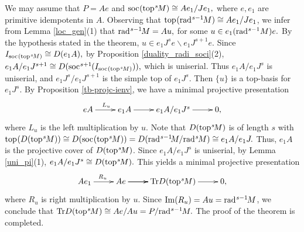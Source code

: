 \documentclass[10pt]{amsart}
\theoremstyle{definition}
\newcommand{\rad}{{\rm rad}\hspace{.5pt}}
\newcommand{\soc}{{\rm soc}\hspace{.5pt}}
\newcommand{\ntop}{{\rm top}\hspace{.5pt}}
\newcommand{\vp}{\vspace{.5pt}}
\begin{document}
We may assume that $P=Ae$ and $\soc(\ntop^s\hspace{-1pt}M)\cong Ae_1/Je_1,$ where $e, e_1$ are primitive idempotents in $A$. Observing that $\ntop(\rad^{s-1}\hspace{-1pt}M)\cong Ae_1/Je_1$, we infer from Lemma \ref{loc_gen}(1) that $\rad^{s-1}\hspace{-1pt}M=Au,$ for some $u\in e_1 (\rad^{s-1}M)e.$ By the hypothesis stated in the theorem, $u \in e_1J^se \backslash e_1J^{s+1} e$. Since $I_{\soc(\ntop^s\hspace{-1pt}M)}\cong D(e_1A),$ by Proposition \ref{duality_radi_soci}(2), $e_1A/e_1J^{s+1}\cong D(\soc^{s+1}\hspace{-.5pt}(I_{\soc(\ntop^s\hspace{-1pt}M)})),$ which is uniserial. Thus $e_1A/e_1J^s$ is uniserial, and $e_1J^s/e_1J^{s+1}$ is the simple top of $e_1J^s.$ Then $\{u\}$ is a top-basis for $e_1J^s.$ By Proposition \ref{tb-projc-ienv}, we have a minimal projective presentation \vspace{-10pt} $$\xymatrix{eA \ar[r]^{L_u} & e_1A \ar[r] & e_1A/e_1J^s\ar[r] & 0,}\vspace{-2.5pt}$$ where $L_u$ is the left multiplication by $u$. \vspace{0.5pt} Note that $D(\ntop^s\hspace{-1.5pt}M)$ is of length $s$ with $\ntop(D(\ntop^s\hspace{-1pt}M))\cong D(\soc(\ntop^s\hspace{-1pt}M))= D(\rad^{s-1}\hspace{-2pt}M/\rad^s\hspace{-1pt}M)\cong e_1A/e_1J.$ \vp Thus, $e_1A$ is the projective cover of $D(\ntop^s\hspace{-1.5pt}M)$. Since $e_1A/e_1J^s$ is uniserial, by Lemma \ref{uni_pi}(1), $e_1A/e_1J^s\cong D(\ntop^s\hspace{-1pt}M).$ This yields a minimal projective presentation \vspace{-5pt}
$$\xymatrix{Ae_1 \ar[r]^{R_u} & Ae \ar[r] \ar[r] & {\rm Tr}D(\ntop^s\hspace{-1pt}M) \ar[r] & 0,}\vspace{-5pt}$$ where $R_u$ is right multiplication by $u$. Since ${\rm Im}(R_u)=Au=\rad^{s-1}\hspace{-1pt}M$, we conclude that ${\rm Tr}D(\ntop^s\hspace{-1pt}M)\cong Ae/Au=P/\rad^{s-1}\hspace{-1pt}M.$ The proof of the theorem is completed.
\end{document}
